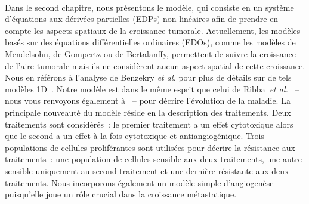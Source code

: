 \documentclass[main.tex]{subfiles}
\begin{document}
\paragraph{}
Dans le second chapitre, nous présentons le modèle, qui consiste en un système d'équations aux dérivées partielles (EDPs) non linéaires afin de prendre en compte les aspects spatiaux de la croissance tumorale. Actuellement, 
les modèles basés sur des équations différentielles ordinaires (EDOs), comme les modèles de Mendelsohn, de Gompertz ou de 
Bertalanffy, permettent de suivre la croissance de l'aire tumorale mais ils ne considèrent aucun aspect spatial de cette croissance. Nous en référons à l'analyse de Benzekry {\it et al.} pour plus de détails sur de tels modèles 1D~\cite{benzekry2014}. 
Notre modèle est dans le même esprit que celui de Ribba~{\it et
  al.}~\cite{Ribba2006532} -- nous vous renvoyons également à~\cite{Iollo2012,gallinato2014} -- pour décrire l'évolution de la maladie. La principale nouveauté du modèle réside en la description des traitements. Deux traitements sont considérés~: le premier traitement a un effet cytotoxique alors que le second a un effet à la fois cytotoxique et antiangiogénique. Trois populations de cellules proliférantes sont utilisées pour décrire la résistance aux traitements~: une population de cellules sensible aux deux traitements, une autre sensible uniquement au second traitement et une dernière résistante aux deux traitements.  
Nous incorporons également un modèle simple d'angiogenèse puisqu'elle joue un rôle crucial dans la croissance métastatique.


\end{document}
